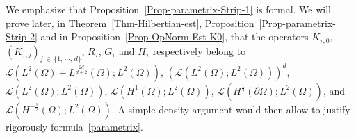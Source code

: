 \documentclass[AHL,Unicode,longabstracts]{cedram}
\newcommand{\scL}{\mathscr{L}}
\begin{document}
\begin{rema}
We emphasize that Proposition~\ref{Prop-parametrix-Strip-1} is formal. We will prove later, in Theorem~\ref{Thm-Hilbertian-est}, Proposition~\ref{Prop-parametrix-Strip-2} and in Proposition~\ref{Prop-OpNorm-Est-K0}, that the operators $K_{\tau,0}$, $(K_{\tau,j})_{j \,\in\,\{1,\,\cdots,\,d\} }$, $R_\tau$, $G_\tau$ and $H_{\tau}$ respectively belong to $\scL(L^{2}(\Omega) + L^{\frac{2d}{d+2}}(\Omega); L^2(\Omega))$, $(\scL(L^{2}(\Omega) ; L^2(\Omega)))^d$, $\scL(L^{2}(\Omega); L^2(\Omega))$, $\scL(H^{1}(\Omega); L^2(\Omega))$, $\scL(H^{\frac{1}{2}}(\partial\Omega); L^2(\Omega))$, and $\scL(H^{-\frac{1}{2}}(\Omega); L^2(\Omega))$. A simple density argument would then allow to justify rigorously formula~\eqref{parametrix}.
\end{rema}
\end{document}
